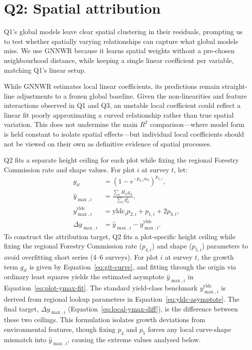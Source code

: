 \documentclass[logo,msc,ai]{infthesis}           %
\begin{document}
\section{Q2: Spatial attribution}

Q1's global models leave clear spatial clustering in their residuals, prompting us to test whether spatially varying relationships can capture what global models miss. We use GNNWR \cite{du2020Geographically_C6_GWR} because it learns spatial weights without a pre-chosen neighbourhood distance, while keeping a single linear coefficient per variable, matching Q1's linear setup.

While GNNWR estimates local linear coefficients, its predictions remain straight-line adjustments to a frozen global baseline. Given the non-linearities and feature interactions observed in Q1 and Q3, an unstable local coefficient could reflect a linear fit poorly approximating a curved relationship rather than true spatial variation. This does not undermine the main $R^2$ comparison—where model form is held constant to isolate spatial effects—but individual local coefficients should not be viewed on their own as definitive evidence of spatial processes.

Q2 fits a separate height ceiling for each plot while fixing the regional Forestry Commission rate and shape values. For plot $i$ at survey $t$, let:
\begin{align}
g_{it} &= \left(1-e^{-p_{4,i}a_{it}}\right)^{p_{5,i}}, \label{eq:git-curve} \\
\hat y_{\max,i} &= \frac{\sum_t H_{it}g_{it}}{\sum_t g_{it}^2}, \label{eq:plot-ymax-fit} \\
y_{\max,i}^{\mathrm{yldc}} &= \mathrm{yldc}_i p_{2,i}+p_{1,i}+2p_{3,i}, \label{eq:yldc-asymptote} \\
\Delta y_{\max,i} &= \hat y_{\max,i}-y_{\max,i}^{\mathrm{yldc}}. \label{eq:local-ymax-diff}
\end{align}
To construct the attribution target, Q2 fits a plot-specific height ceiling while fixing the regional Forestry Commission rate ($p_{4,i}$) and shape ($p_{5,i}$) parameters to avoid overfitting short series (4--6 surveys). For plot $i$ at survey $t$, the growth term $g_{it}$ is given by Equation~\eqref{eq:git-curve}, and fitting through the origin via ordinary least squares yields the estimated asymptote $\hat y_{\max,i}$ in Equation~\eqref{eq:plot-ymax-fit}. The standard yield-class benchmark $y_{\max,i}^{\mathrm{yldc}}$ is derived from regional lookup parameters in Equation~\eqref{eq:yldc-asymptote}. The final target, $\Delta y_{\max,i}$ (Equation~\eqref{eq:local-ymax-diff}), is the difference between these two ceilings. This formulation isolates growth deviations from environmental features, though fixing $p_4$ and $p_5$ forces any local curve-shape mismatch into $\hat y_{\max,i}$, causing the extreme values analysed below.
\end{document}
